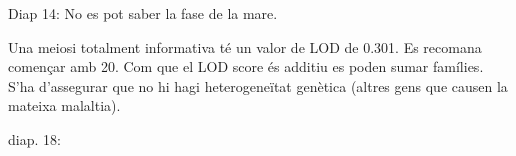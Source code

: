Diap 14: No es pot saber la fase de la mare.

Una meiosi totalment informativa té un valor de LOD de 0.301. Es
recomana començar amb 20. Com que el LOD score és additiu es poden
sumar famílies. S'ha d'assegurar que no hi hagi heterogeneïtat
genètica (altres gens que causen la mateixa malaltia).

diap. 18: 